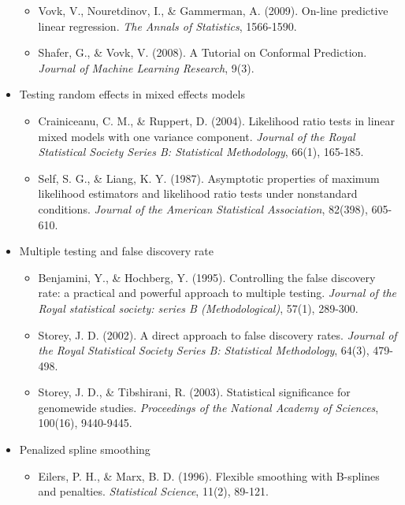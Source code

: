 \documentclass[11pt]{article}
\begin{document}
\begin{itemize}
\begin{itemize}
\item Vovk, V., Nouretdinov, I., \& Gammerman, A. (2009). On-line predictive linear regression. \textit{The Annals of Statistics}, 1566-1590.

\item Shafer, G., \& Vovk, V. (2008). A Tutorial on Conformal Prediction. \textit{Journal of Machine Learning Research}, 9(3).
\end{itemize}

\item Testing random effects in mixed effects models
\begin{itemize}
\item Crainiceanu, C. M., \& Ruppert, D. (2004). Likelihood ratio tests in linear mixed models with one variance component. \textit{Journal of the Royal Statistical Society Series B: Statistical Methodology}, 66(1), 165-185.

\item Self, S. G., \& Liang, K. Y. (1987). Asymptotic properties of maximum likelihood estimators and likelihood ratio tests under nonstandard conditions. \textit{Journal of the American Statistical Association}, 82(398), 605-610.
\end{itemize}

\item Multiple testing and false discovery rate
\begin{itemize}
\item Benjamini, Y., \& Hochberg, Y. (1995). Controlling the false discovery rate: a practical and powerful approach to multiple testing. \textit{Journal of the Royal statistical society: series B (Methodological)}, 57(1), 289-300.

\item Storey, J. D. (2002). A direct approach to false discovery rates. \textit{Journal of the Royal Statistical Society Series B: Statistical Methodology}, 64(3), 479-498.

\item Storey, J. D., \& Tibshirani, R. (2003). Statistical significance for genomewide studies. \textit{Proceedings of the National Academy of Sciences}, 100(16), 9440-9445.
\end{itemize}

\item Penalized spline smoothing
\begin{itemize}
\item Eilers, P. H., \& Marx, B. D. (1996). Flexible smoothing with B-splines and penalties. \textit{Statistical Science}, 11(2), 89-121.


\end{itemize}
\end{itemize}
\end{document}
